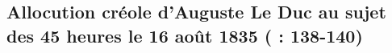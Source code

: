 \documentclass[output=paper]{langscibook}
\begin{document}
\begin{otherlanguage}{french}
\begin{xltabular}{\textwidth}{@{}>{\hangindent=1em}Q>{\hangindent=1em}Q@{}}
\end{xltabular}


\subsection{Allocution créole d’Auguste Le Duc au sujet des 45 heures le 16 août 1835 (\citealt{Pourcelet1994} : 138-140)}\label{sec:kriegel:3.2}


\end{otherlanguage}
\end{document}
